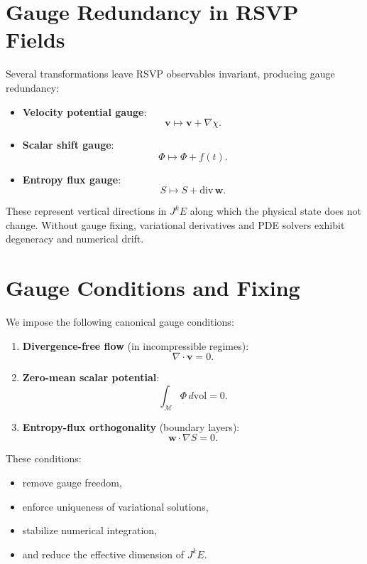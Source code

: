 \section{Gauge Redundancy in RSVP Fields}

Several transformations leave RSVP observables invariant, producing gauge redundancy:

\begin{itemize}
\item \textbf{Velocity potential gauge}:
\[
\mathbf{v} \mapsto \mathbf{v} + \nabla\chi.
\]
\item \textbf{Scalar shift gauge}:
\[
\Phi \mapsto \Phi + f(t).
\]
\item \textbf{Entropy flux gauge}:
\[
S \mapsto S + \mathrm{div}\,\mathbf{w}.
\]
\end{itemize}

These represent vertical directions in $J^k E$ along which the physical state does not change. Without gauge fixing, variational derivatives and PDE solvers exhibit degeneracy and numerical drift.

\section{Gauge Conditions and Fixing}

We impose the following canonical gauge conditions:

\begin{enumerate}
\item \textbf{Divergence-free flow} (in incompressible regimes):
\[
\nabla\cdot\mathbf{v}=0.
\]

\item \textbf{Zero-mean scalar potential}:
\[
\int_{\mathcal{M}} \Phi\, d\mathrm{vol} = 0.
\]

\item \textbf{Entropy-flux orthogonality} (boundary layers):
\[
\mathbf{w}\cdot\nabla S = 0.
\]
\end{enumerate}

These conditions:
\begin{itemize}
\item remove gauge freedom,
\item enforce uniqueness of variational solutions,
\item stabilize numerical integration,
\item and reduce the effective dimension of $J^k E$.
\end{itemize}

